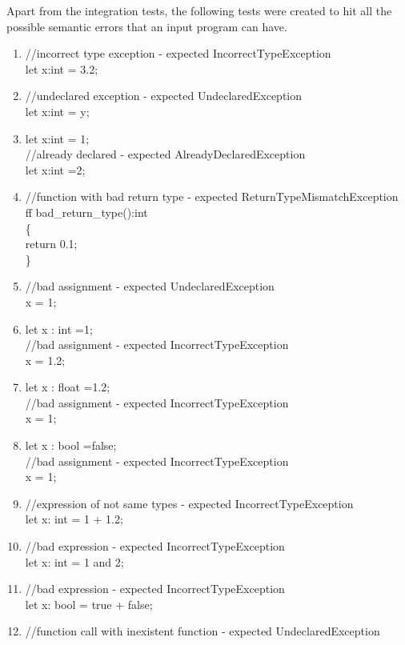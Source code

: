\documentclass{article}
\newcommand\tab[1][1cm]{\hspace*{#1}}
\begin{document}
			Apart from the integration tests, the following tests were created to hit all the possible semantic errors that an input program can have. 
			
			\begin{enumerate}
			\item
			//incorrect type exception - expected IncorrectTypeException\\
let x:int = 3.2;
			\item
			//undeclared exception - expected UndeclaredException\\
let x:int = y;
			\item
			let x:int = 1;\\
//already declared - expected AlreadyDeclaredException\\
let x:int =2;
			\item
			//function with bad return type - expected ReturnTypeMismatchException\\
ff bad\_return\_type():int\\
\{ \\
\tab return 0.1;\\
\} \\
			\item
			//bad assignment  - expected UndeclaredException\\
x = 1;
			\item
			let x : int =1;\\
//bad assignment - expected IncorrectTypeException\\
x = 1.2;
			\item
			let x : float =1.2;\\
//bad assignment - expected IncorrectTypeException\\
x = 1;
			\item
			let x : bool =false;\\
//bad assignment - expected IncorrectTypeException\\
x = 1;
			\item
			//expression of not same types - expected IncorrectTypeException\\
let x: int = 1 + 1.2;
			\item
			//bad expression - expected IncorrectTypeException\\
let x: int = 1 and 2;
			\item
			//bad expression - expected IncorrectTypeException\\
let x: bool = true + false;
			\item
			//function call with inexistent function - expected UndeclaredException\\

\end{enumerate}
\end{document}
